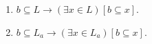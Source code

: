 \begin{enumerate}
\item $b \subseteq L \rightarrow (\exists x \in L)[b \subseteq x]$.
\item $b \subseteq L_a \rightarrow (\exists x \in L_a)[b \subseteq x]$.
\end{enumerate}
